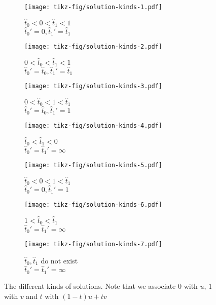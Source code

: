 \begin{figure}
    \centering
    \begin{subfigure}[t]{0.3\textwidth}
      \texttt{[image: tikz-fig/solution-kinds-1.pdf]}
      \caption{\(\hat t_0 < 0 < \hat t_1 < 1\) \\ 
        \(\hat t_0' = 0, \hat t_1' = \hat t_1\)}
    \end{subfigure}
    \hfill
    \begin{subfigure}[t]{0.3\textwidth}
      \texttt{[image: tikz-fig/solution-kinds-2.pdf]}
      \caption{\(0 < \hat t_0 < \hat t_1 < 1\)\\ 
        \(\hat t_0' = \hat t_0, \hat t_1' = \hat t_1\)}
    \end{subfigure}
    \hfill
    \begin{subfigure}[t]{0.3\textwidth}
      \texttt{[image: tikz-fig/solution-kinds-3.pdf]}
      \caption{\(0 < \hat t_0 < 1 < \hat t_1 \) \\
        \(\hat t_0' = \hat t_0, \hat t_1' = 1\)}
    \end{subfigure}

    \begin{subfigure}[t]{0.3\textwidth}
      \texttt{[image: tikz-fig/solution-kinds-4.pdf]}
      \caption{\(\hat t_0 < \hat t_1 < 0\)\\ 
        \(\hat t_0' = \hat t_1' = \infty\)}
    \end{subfigure}
    \hfill
    \begin{subfigure}[t]{0.3\textwidth}
      \texttt{[image: tikz-fig/solution-kinds-5.pdf]}
      \caption{\(\hat t_0 < 0 < 1 < \hat t_1\)\\ 
        \(\hat t_0' = 0, \hat t_1' = 1\)}
    \end{subfigure}
    \hfill
    \begin{subfigure}[t]{0.3\textwidth}
      \texttt{[image: tikz-fig/solution-kinds-6.pdf]}
      \caption{\(1 < \hat t_0 < \hat t_1\)\\ 
        \(\hat t_0' =  \hat t_1' = \infty\)}
    \end{subfigure}

    \begin{subfigure}[t]{0.3\textwidth}
      \texttt{[image: tikz-fig/solution-kinds-7.pdf]}
      \caption{\(\hat t_0, \hat t_1\) do not exist\\ 
        \(\hat t_0' = \hat t_1' = \infty\)}
    \end{subfigure}
    \caption{The different kinds of solutions. Note that we associate \(0\) with \(u\), \(1\) with \(v\) and \(t\) with \((1-t)u + tv\)}
    \label{fig:solution_kinds}
\end{figure}

